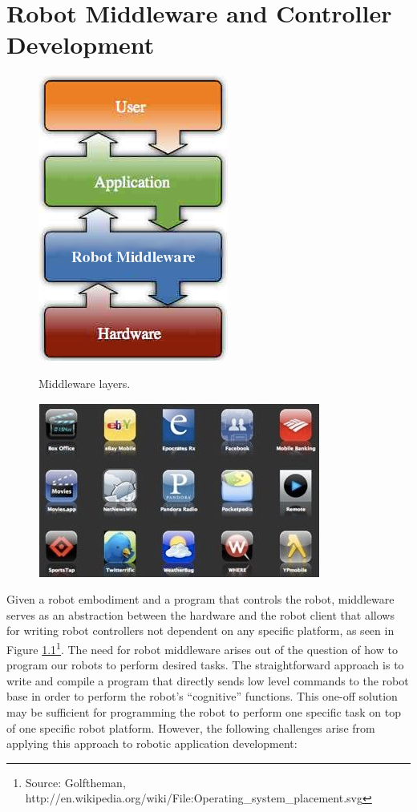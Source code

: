 
\chapter{Robot Middleware and Controller Development}
\label{sec:robot_middleware}

\begin{figure}[!h]
\centering
\includegraphics[width=0.5\columnwidth]{figures/3_abstraction.jpg}
\label{fig:3_abstraction}
\caption{Middleware layers.}
\end{figure}
\newpage

\begin{figure}
\includegraphics[width=0.53\columnwidth]{figures/3_app_store.jpg}
\end{figure}

Given a robot embodiment and a program that controls the robot, middleware serves as an abstraction between the hardware and the robot client that allows for writing robot controllers not dependent on any specific platform, as seen in Figure \ref{fig:3_abstraction}\footnote{Source: Golftheman, http://en.wikipedia.org/wiki/File:Operating\_system\_placement.svg}. The need for robot middleware arises out of the question of how to program our robots to perform desired tasks. The straightforward approach is to write and compile a program that directly sends low level commands to the robot base in order to perform the robot's ``cognitive'' functions. This one-off solution may be sufficient for programming the robot to perform one specific task on top of one specific robot platform.  However, the following challenges arise from applying this approach to robotic application development:

